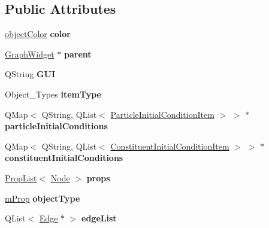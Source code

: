 \subsection*{Public Attributes}
\begin{DoxyCompactItemize}
\item 
\mbox{\label{class_node_a0666a219217b1391517874969f6e11f9}} 
\hyperlink{structobject_color}{object\+Color} {\bfseries color}
\item 
\mbox{\label{class_node_a6c4b06e830b14e849a444261c4809585}} 
\hyperlink{class_graph_widget}{Graph\+Widget} $\ast$ {\bfseries parent}
\item 
\mbox{\label{class_node_a0b9671a414292b511645370a0eb9bc0e}} 
Q\+String {\bfseries G\+UI}
\item 
\mbox{\label{class_node_acade8e66cf2c1be76bcaf61b53af611d}} 
Object\+\_\+\+Types {\bfseries item\+Type}
\item 
\mbox{\label{class_node_a44620ce5d638f77d2f0d51df959327c8}} 
Q\+Map$<$ Q\+String, Q\+List$<$ \hyperlink{struct_particle_initial_condition_item}{Particle\+Initial\+Condition\+Item} $>$ $>$ $\ast$ {\bfseries particle\+Initial\+Conditions}
\item 
\mbox{\label{class_node_abebd6f16b652673b2787272ee70a0a57}} 
Q\+Map$<$ Q\+String, Q\+List$<$ \hyperlink{struct_constituent_initial_condition_item}{Constituent\+Initial\+Condition\+Item} $>$ $>$ $\ast$ {\bfseries constituent\+Initial\+Conditions}
\item 
\mbox{\label{class_node_a4d82cd8e549018cdfcb12f6aa1971027}} 
\hyperlink{class_prop_list}{Prop\+List}$<$ \hyperlink{class_node}{Node} $>$ {\bfseries props}
\item 
\mbox{\label{class_node_a06395c469e45dd4837d1715f8f714250}} 
\hyperlink{classm_prop}{m\+Prop} {\bfseries object\+Type}
\item 
\mbox{\label{class_node_aa3d4ff6b0ff70dfe1650fb5d07426032}} 
Q\+List$<$ \hyperlink{class_edge}{Edge} $\ast$ $>$ {\bfseries edge\+List}
\item 
\mbox{\label{class_node_ac261eb82efc0bf615aa0a21cb7e013fb}} 

\end{DoxyCompactItemize}
